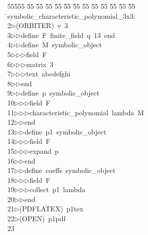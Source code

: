 %
%
\begin{tabbing}
55555 \= 55 \= 55 \= 55 \= 55 \= 55 \= 55 \= 55 \= 55 \= 55 \= 55 \= 55 \= 55 \= \>symbolic\_characteristic\_polynomial\_3x3:\\[0pt]
2\>$\triangleright$\>(ORBITER)\ v\ 3\ \\[0pt]
3\>$\triangleright$\>$\triangleright$\>define\ F\ finite\_field\ q\ 13\ end\ \\[0pt]
4\>$\triangleright$\>$\triangleright$\>define\ M\ symbolic\_object\ \\[0pt]
5\>$\triangleright$\>$\triangleright$\>$\triangleright$\>field\ F\ \\[0pt]
6\>$\triangleright$\>$\triangleright$\>$\triangleright$\>matrix\ 3\ \\[0pt]
7\>$\triangleright$\>$\triangleright$\>$\triangleright$\>text\ abcdefghi\ \\[0pt]
8\>$\triangleright$\>$\triangleright$\>end\ \\[0pt]
9\>$\triangleright$\>$\triangleright$\>define\ p\ symbolic\_object\ \\[0pt]
10\>$\triangleright$\>$\triangleright$\>$\triangleright$\>field\ F\ \\[0pt]
11\>$\triangleright$\>$\triangleright$\>$\triangleright$\>characteristic\_polynomial\ lambda\ M\ \\[0pt]
12\>$\triangleright$\>$\triangleright$\>end\ \\[0pt]
13\>$\triangleright$\>$\triangleright$\>define\ p1\ symbolic\_object\ \\[0pt]
14\>$\triangleright$\>$\triangleright$\>$\triangleright$\>field\ F\ \\[0pt]
15\>$\triangleright$\>$\triangleright$\>$\triangleright$\>expand\ p\ \\[0pt]
16\>$\triangleright$\>$\triangleright$\>end\ \\[0pt]
17\>$\triangleright$\>$\triangleright$\>define\ coeffs\ symbolic\_object\ \\[0pt]
18\>$\triangleright$\>$\triangleright$\>$\triangleright$\>field\ F\ \\[0pt]
19\>$\triangleright$\>$\triangleright$\>$\triangleright$\>collect\ p1\ lambda\ \\[0pt]
20\>$\triangleright$\>$\triangleright$\>end\\[0pt]
21\>$\triangleright$\>(PDFLATEX)\ p1tex\\[0pt]
22\>$\triangleright$\>(OPEN)\ p1pdf\\[0pt]
23\>\end{tabbing}
